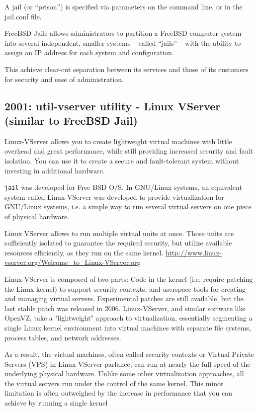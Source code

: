 A jail (or	``prison'') is specified via parameters	on the command
line, or in the jail.conf file.
     

FreeBSD Jails allows administrators to partition a FreeBSD computer system into
several independent, smaller systems – called “jails” – with the ability to
assign an IP address for each system and configuration.

This achieve clear-cut separation between its services and those of its
customers for security and ease of administration.

\subsection{2001: util-vserver utility - Linux VServer (similar to FreeBSD Jail)}

Linux-VServer allows you to create lightweight virtual machines with little
overhead and great performance, while still providing increased security and
fault isolation. You can use it to create a secure and fault-tolerant system
without investing in additional hardware.
 
\verb!jail! was developed for Free BSD O/S. In GNU/Linux systems, an equivalent
system called Linux-VServer was developed to provide virtualization for
GNU/Linux systems, i.e. a simple way to run several virtual servers on one piece
of physical hardware.

Linux VServer allows to run multiple virtual units at once. Those units are
sufficiently isolated to guarantee the required security, but utilize available
resources efficiently, as they run on the same kernel.
\url{http://www.linux-vserver.org/Welcome_to_Linux-VServer.org}

Linux-VServer is composed of two parts: Code in the kernel (i.e. require
patching the Linux kernel) to support security contexts, and userspace tools for
creating and managing virtual servers. Experimental patches are still available,
but the last stable patch was released in 2006. Linux-VServer, and similar
software like OpenVZ, take a "lightweight" approach to virtualization,
essentially segmenting a single Linux kernel environment into virtual machines
with separate file systems, process tables, and network addresses.

As a result, the virtual machines, often called security contexts or Virtual
Private Servers (VPS) in Linux-VServer parlance, can run at nearly the full
speed of the underlying physical hardware.
Unlike some other virtualization approaches, all the virtual servers run under
the control of the same kernel. This minor limitation is often outweighed by the
increase in performance that you can achieve by running a single kernel

